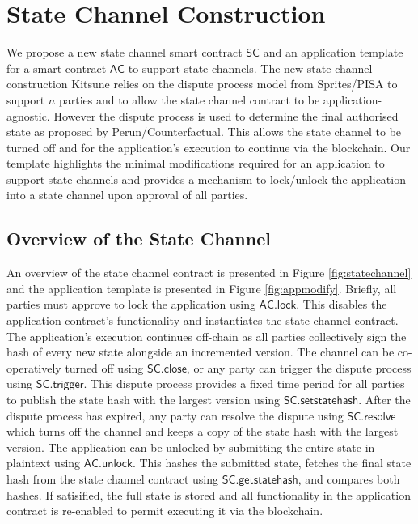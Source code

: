 \documentclass{llncs}
\newcommand{\statechannel}{\mathsf{SC}}
\newcommand{\statechanneldispute}{\mathsf{SC}.\mathsf{trigger}}
\newcommand{\statechannelsetstate}{\mathsf{SC}.\mathsf{setstatehash}}
\newcommand{\statechannelresolve}{\mathsf{SC}.\mathsf{resolve}}
\newcommand{\statechannelgetcommitment}{\mathsf{SC}.\mathsf{getstatehash}}
\newcommand{\statechannelclose}{\mathsf{SC}.\mathsf{close}}
\newcommand{\appcontract}{\mathsf{AC}}
\newcommand{\applock}{\mathsf{AC.lock}}
\newcommand{\appunlock}{\mathsf{AC.unlock}}
\begin{document}
	\section{State Channel Construction} 
	
	We propose a new state channel smart contract $\statechannel$ and an application template for a smart contract $\appcontract$ to support state channels. 
	The new state channel construction  \textsf{Kitsune} relies on the dispute process model from Sprites/PISA to support $n$ parties and to allow the state channel contract to be application-agnostic. 
	However the dispute process is used to determine the final authorised state as proposed by Perun/Counterfactual. 
	This allows the state channel to be turned off and for the application's execution to continue via the blockchain.
	Our template highlights the minimal modifications required for an application to support state channels and provides a mechanism to lock/unlock the application into a state channel upon approval of all parties. 
	
	\subsection{Overview of the State Channel}
	
	An overview of the state channel contract is presented in Figure \ref{fig:statechannel} and the application template is presented in Figure \ref{fig:appmodify}. 
	Briefly, all parties must approve to lock the application using $\applock$.
	This disables the application contract's functionality and instantiates the state channel contract. 
	The application's execution continues off-chain as all parties collectively sign the hash of every new state alongside an incremented version. %
	The channel can be co-operatively turned off using $\statechannelclose$, or any party can trigger the dispute process using $\statechanneldispute$.
	This dispute process provides  a fixed time period  for all parties to publish the state hash with the largest version using $\statechannelsetstate$. 
	After the dispute process has expired, any party can resolve the dispute using $\statechannelresolve$ which turns off the channel and keeps a copy of the state hash with the largest version. 
	The application can be unlocked by submitting the entire state in plaintext using $\appunlock$. 
	This  hashes the submitted state, fetches the final state hash from the state channel contract using $\statechannelgetcommitment$, and  compares both hashes.
	If satisified, the full state is stored and all functionality in the application contract is re-enabled to permit executing it via the blockchain. 
\end{document}
